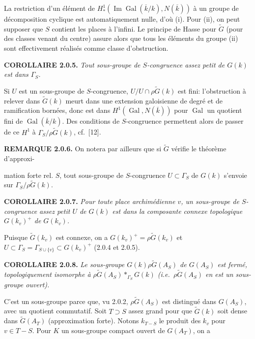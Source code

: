 \documentclass[10pt,a4paper]{article}
\newcommand{\SourcePage}[2]{\clearpage\setcounter{page}{#2}\typeout{D031_SOURCE_PAGE physical=#1 printed=#2}}
\begin{document}
La restriction d'un élément de \(H_*^1(\operatorname{Im}\operatorname{Gal}(\overline k/k),N(\overline k))\) à un groupe de décomposition cyclique est automatiquement nulle, d'où (i). Pour (ii), on peut supposer que \(S\) contient les places à l'infini. Le principe de Hasse pour \(\widetilde G\) (pour des classes venant du centre) assure alors que tous les éléments du groupe (ii) sont effectivement réalisés comme classe d'obstruction.

\textbf{COROLLAIRE 2.0.5.} \emph{Tout sous-groupe de \(S\)-congruence assez petit de \(G(k)\) est dans \(\Gamma_S\).}

Si \(U\) est un sous-groupe de \(S\)-congruence, \(U/U\cap\rho\widetilde G(k)\) est fini: l'obstruction à relever dans \(\widetilde G(k)\) meurt dans une extension galoisienne de degré et de ramification bornées, donc est dans \(H^1(\operatorname{Gal},N(\overline k))\) pour \(\operatorname{Gal}\) un quotient fini de \(\operatorname{Gal}(\overline k/k)\). Des conditions de \(S\)-congruence permettent alors de passer de ce \(H^1\) à \(\Gamma_S/\rho\widetilde G(k)\), cf.~{[}12{]}.

\textbf{REMARQUE 2.0.6.} On notera par ailleurs que si \(\widetilde G\) vérifie le théorème d'approxi-

\SourcePage{18}{264}
mation forte rel. \(S\), tout sous-groupe de \(S\)-congruence \(U\subset\Gamma_S\) de \(G(k)\) s'envoie sur \(\Gamma_S/\rho\widetilde G(k)\).

\textbf{COROLLAIRE 2.0.7.} \emph{Pour toute place archimédienne \(v\), un sous-groupe de \(S\)-congruence assez petit \(U\) de \(G(k)\) est dans la composante connexe topologique \(G(k_v)^+\) de \(G(k_v)\).}

Puisque \(\widetilde G(k_v)\) est connexe, on a \(G(k_v)^+=\rho\widetilde G(k_v)\) et \(U\subset\Gamma_S=\Gamma_{S\cup\{v\}}\subset G(k_v)^+\) (2.0.4 et 2.0.5).

\textbf{COROLLAIRE 2.0.8.} \emph{Le sous-groupe \(G(k)\rho\widetilde G(A_S)\) de \(G(A_S)\) est fermé, topologiquement isomorphe à \(\rho\widetilde G(A_S)*_{\Gamma_S}G(k)\) (i.e.~\(\rho\widetilde G(A_S)\) en est un sous-groupe ouvert).}

C'est un sous-groupe parce que, vu 2.0.2, \(\rho\widetilde G(A_S)\) est distingué dans \(G(A_S)\), avec un quotient commutatif. Soit \(T\supset S\) assez grand pour que \(\widetilde G(k)\) soit dense dans \(\widetilde G(A_T)\) (approximation forte). Notons \(k_{T-S}\) le produit des \(k_v\) pour \(v\in T-S\). Pour \(K\) un sous-groupe compact ouvert de \(G(A_T)\), on a
\end{document}
